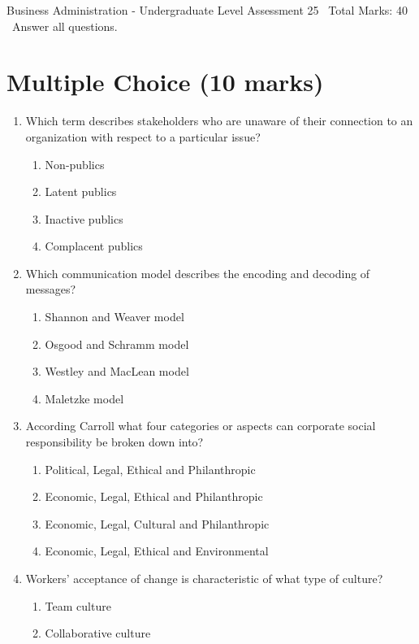 \documentclass[12pt]{article}
\begin{document}
\begin{center}
Business Administration - Undergraduate Level Assessment 25 \
Total Marks: 40 \
Answer all questions.
\end{center}

\section*{Multiple Choice (10 marks)}
\begin{enumerate}[label=\arabic*.]
\item Which term describes stakeholders who are unaware of their connection to an organization with respect to a particular issue?
\begin{enumerate}[label=(\alph*)]
    \item Non-publics
    \item Latent publics
    \item Inactive publics
    \item Complacent publics
\end{enumerate}
\item Which communication model describes the encoding and decoding of messages?
\begin{enumerate}[label=(\alph*)]
    \item Shannon and Weaver model
    \item Osgood and Schramm model
    \item Westley and MacLean model
    \item Maletzke model
\end{enumerate}
\item According Carroll what four categories or aspects can corporate social responsibility be broken down into?
\begin{enumerate}[label=(\alph*)]
    \item Political, Legal, Ethical and Philanthropic
    \item Economic, Legal, Ethical and Philanthropic
    \item Economic, Legal, Cultural and Philanthropic
    \item Economic, Legal, Ethical and Environmental
\end{enumerate}
\item Workers' acceptance of change is characteristic of what type of culture?
\begin{enumerate}[label=(\alph*)]
    \item Team culture
    \item Collaborative culture

\end{enumerate}
\end{enumerate}
\end{document}
